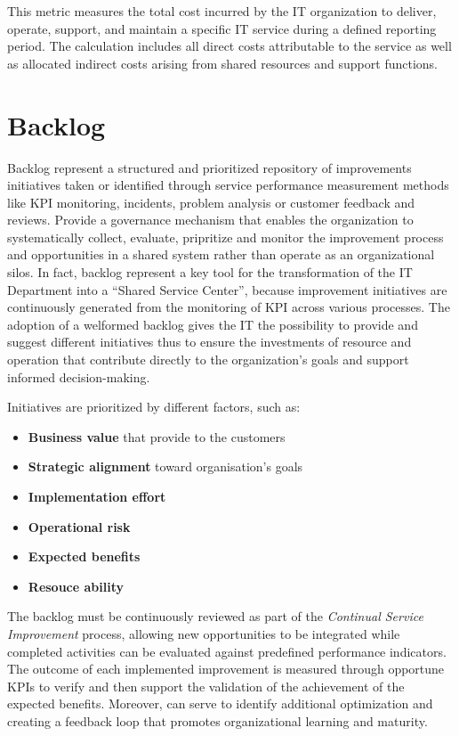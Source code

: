 This metric measures the total cost incurred by the IT organization to deliver, operate, support, and maintain a specific IT service during a defined reporting period. The calculation includes all direct costs attributable to the service as well as allocated indirect costs arising from shared resources and support functions.




\section{Backlog}
\label{subs:backlog}




Backlog represent a structured and prioritized repository of improvements initiatives taken or identified through service performance measurement methods like KPI monitoring, incidents, problem analysis or customer feedback and reviews.
Provide a governance mechanism that enables the organization to systematically collect, evaluate, pripritize and monitor the improvement process and opportunities in a shared system rather than operate as an organizational silos.
In fact, backlog represent a key tool for the transformation of the IT Department into a ``Shared Service Center'', because improvement initiatives are continuously generated from the monitoring of KPI across various processes. The adoption of a welformed backlog gives the IT the possibility to provide and suggest different initiatives thus to ensure the investments of resource and operation that contribute directly to the organization's goals and  support informed decision-making.

Initiatives are prioritized by different factors, such as:
\begin{itemize}
    \item \textbf{Business value} that provide to the customers
    \item \textbf{Strategic alignment} toward organisation's goals
    \item \textbf{Implementation effort}
    \item \textbf{Operational risk}
    \item \textbf{Expected benefits}
    \item \textbf{Resouce ability}
\end{itemize}

The backlog must be continuously reviewed as part of the \textit{Continual Service Improvement} process, allowing new opportunities to be integrated while completed activities can be evaluated against predefined performance indicators.
The outcome of each implemented improvement is measured through opportune KPIs to verify and then support the validation of the achievement of the expected benefits. Moreover, can serve to identify additional optimization and creating a feedback loop that promotes organizational learning and maturity.


